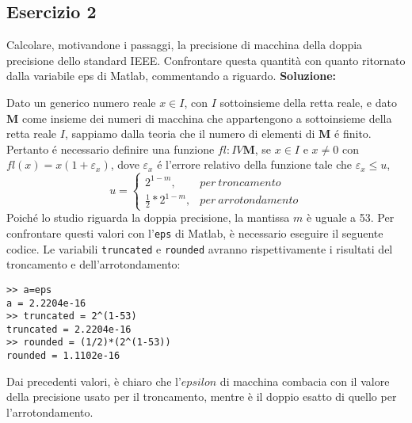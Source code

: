 \subsection{Esercizio 2}
Calcolare, motivandone i passaggi, la precisione di macchina della doppia precisione
dello standard IEEE. Confrontare questa quantità con quanto ritornato dalla variabile eps di
Matlab, commentando a riguardo.
\newline \textbf{Soluzione:}

Dato un generico numero reale $x \in I$, con $I$ sottoinsieme della retta reale, e
dato $\mathbf{M}$ come insieme dei numeri di macchina che appartengono a sottoinsieme
della retta reale $I$, sappiamo dalla teoria che il numero di elementi di $\mathbf{M}$ é finito.
Pertanto é necessario definire una funzione $fl: I V \mathbf{M}$, se $x \in I$ e $x \neq 0$ con
$fl(x) = x(1 + \varepsilon_x)$, dove $\varepsilon_x$ é l'errore relativo della funzione tale che $\varepsilon_x \leq u$,
\begin{equation*}
    u =\begin{cases}
        2^{1-m},             & per\ troncamento    \\
        \frac{1}{2}*2^{1-m}, & per\ arrotondamento
    \end{cases}
\end{equation*}
Poiché lo studio riguarda la doppia precisione, la mantissa $m$ è uguale a 53.
Per confrontare questi valori con l'\lstinline{eps} di Matlab, è necessario eseguire il seguente codice.
Le variabili \lstinline{truncated} e \lstinline{rounded} avranno rispettivamente i risultati del troncamento e dell'arrotondamento:
\begin{lstlisting}
>> a=eps
a = 2.2204e-16
>> truncated = 2^(1-53)
truncated = 2.2204e-16
>> rounded = (1/2)*(2^(1-53))
rounded = 1.1102e-16
\end{lstlisting}
Dai precedenti valori, è chiaro che l'$epsilon$ di macchina combacia con il valore
della precisione usato per il troncamento, mentre è il doppio esatto di quello per
l'arrotondamento.
